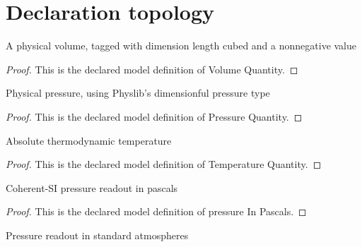 \section{Declaration topology}
\begin{definition}
  \label{def:physics:phyx-mini-0363:phyxminiproblems-problemphyxmini0363-volumequantity}
  A physical volume, tagged with dimension length cubed and a nonnegative value
\end{definition}
\begin{proof}
  This is the declared model definition of Volume Quantity.
\end{proof}
\begin{definition}
  \label{def:physics:phyx-mini-0363:phyxminiproblems-problemphyxmini0363-pressurequantity}
  Physical pressure, using Physlib's dimensionful pressure type
\end{definition}
\begin{proof}
  This is the declared model definition of Pressure Quantity.
\end{proof}
\begin{definition}
  \label{def:physics:phyx-mini-0363:phyxminiproblems-problemphyxmini0363-temperaturequantity}
  Absolute thermodynamic temperature
\end{definition}
\begin{proof}
  This is the declared model definition of Temperature Quantity.
\end{proof}
\begin{definition}
  \label{def:physics:phyx-mini-0363:phyxminiproblems-problemphyxmini0363-pressureinpascals}
  Coherent-SI pressure readout in pascals
\end{definition}
\begin{proof}
  This is the declared model definition of pressure In Pascals.
\end{proof}
\begin{definition}
  \label{def:physics:phyx-mini-0363:phyxminiproblems-problemphyxmini0363-pressureinatmospheres}
  Pressure readout in standard atmospheres
\end{definition}
